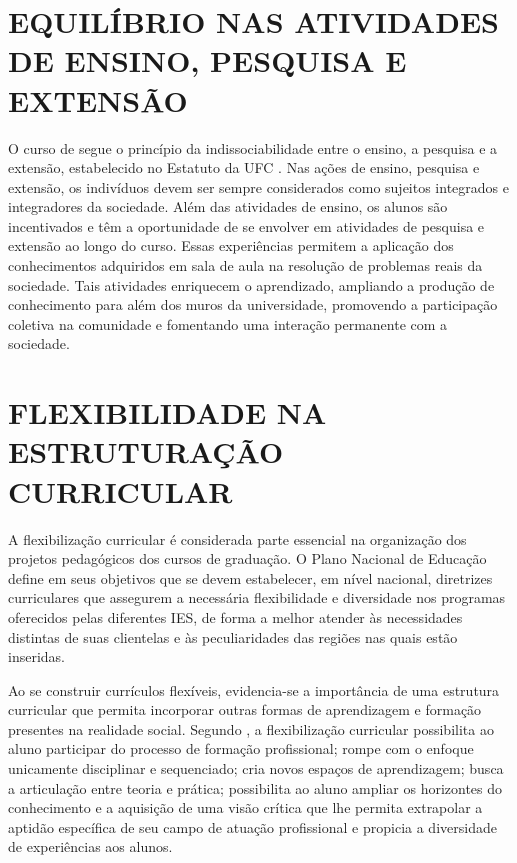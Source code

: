 \section{EQUILÍBRIO NAS ATIVIDADES DE ENSINO, PESQUISA E EXTENSÃO}

O curso de \nomedocurso segue o princípio da indissociabilidade entre o ensino, a pesquisa e a extensão, estabelecido no Estatuto da UFC \cite{ufc2025estatuto}. Nas ações de ensino, pesquisa e extensão, os indivíduos devem ser sempre considerados como sujeitos integrados e integradores da sociedade. Além das atividades de ensino, os alunos são incentivados e têm a oportunidade de se envolver em atividades de pesquisa e extensão ao longo do curso. Essas experiências permitem a aplicação dos conhecimentos adquiridos em sala de aula na resolução de problemas reais da sociedade. Tais atividades enriquecem o aprendizado, ampliando a produção de conhecimento para além dos muros da universidade, promovendo a participação coletiva na comunidade e fomentando uma interação permanente com a sociedade.

\section{FLEXIBILIDADE NA ESTRUTURAÇÃO CURRICULAR}

A flexibilização curricular é considerada parte essencial na organização dos projetos pedagógicos dos cursos de graduação. O Plano Nacional de Educação \cite{brasil2014pne} define em seus objetivos que se devem estabelecer, em nível nacional, diretrizes curriculares que assegurem a necessária flexibilidade e diversidade nos programas oferecidos pelas diferentes IES, de forma a melhor atender às necessidades distintas de suas clientelas e às peculiaridades das regiões nas quais estão inseridas.

Ao se construir currículos flexíveis, evidencia-se a importância de uma estrutura curricular que permita incorporar outras formas de aprendizagem e formação presentes na realidade social. Segundo , a flexibilização curricular possibilita ao aluno participar do processo de formação profissional; rompe com o enfoque unicamente disciplinar e sequenciado; cria novos espaços de aprendizagem; busca a articulação entre teoria e prática; possibilita ao aluno ampliar os horizontes do conhecimento e a aquisição de uma visão crítica que lhe permita extrapolar a aptidão específica de seu campo de atuação profissional e propicia a diversidade de experiências aos alunos. %

